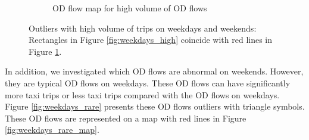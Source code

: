 \documentclass[a4paper,UKenglish]{lipics-v2016}
\begin{document}
\begin{figure}
\begin{subfigure}[b]{0.49\textwidth}
		\caption{OD flow map for high volume of OD flows}
		\label{fig:weekdays_high_map}
	\end{subfigure}
	\caption{Outliers with high volume of trips on weekdays and weekends: Rectangles in Figure \ref{fig:weekdays_high} coincide with red lines in Figure \ref{fig:weekdays_high_map}. }\label{fig:weekdays_high_OD_map}	
\end{figure}

In addition, we investigated which OD flows are abnormal on weekends. However, they are typical OD flows on weekdays. These OD flows can have significantly more taxi trips or less taxi trips compared with the OD flows on weekdays. Figure \ref{fig:weekdays_rare} presents these OD flows outliers with triangle symbols. These OD flows are represented on a map with red lines in Figure \ref{fig:weekdays_rare_map}.
\end{document}
